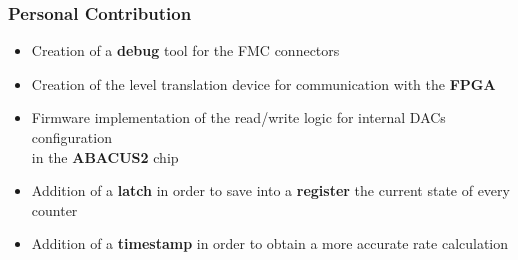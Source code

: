 \documentclass[aspectratio=169]{beamer}
\begin{document}
	
	\begin{frame}
	\frametitle{Personal Contribution}
	\begin{itemize}
		\item {\color{teal} Creation of a \textbf{debug} tool for the FMC connectors}
		\item {\color{teal} Creation of the level translation device for communication with the \textbf{FPGA}}
		\item {\color{teal} Firmware implementation of the read/write logic for internal DACs configuration \\ in the \textbf{ABACUS2} chip}
		\item {\color{teal} Addition of a \textbf{latch} in order to save into a \textbf{register} the current state of every counter}
		\item {\color{teal} Addition of a \textbf{timestamp} in order to obtain a more accurate rate calculation}
	\end{itemize}
	\end{frame}
	
\end{document}

